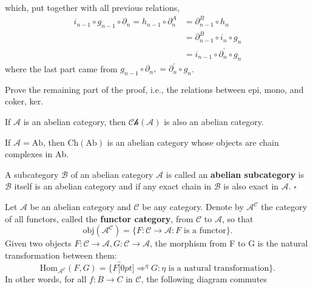 \documentclass[../category_theory.tex]{subfiles}
\begin{document}
\begin{proof*}
\begin{center}
\begin{tikzpicture}
		\end{tikzpicture}
	\end{center}
	which, put together with all previous relations,
	\begin{align*}
		i_{n-1}\circ g_{n-1}\circ \partial_{n} = h_{n-1}\circ \partial_{n}^{A} & =\partial_{n-1}^{B}\circ h_{n}            \\
		                                                                       & =\partial_{n-1}^{B}\circ i_{n}\circ g_{n} \\
		                                                                       & =i_{n-1}\circ \partial_{n}^{'}\circ g_{n}
	\end{align*}
	where the last part came from \(g_{n-1}\circ \partial_{n},=\partial_{n}^{'}\circ g_{n}\).
	\begin{exr}
		Prove the remaining part of the proof, i.e., the relations between epi, mono, and coker, ker. \qedsymbol
	\end{exr}
\end{proof*}
\begin{theorem*}
	If \(\mathcal{A}\) is an abelian category, then \(\mathcal{Ch}(\mathcal{A})\) is also an abelian category.
\end{theorem*}
\begin{example}
	If \(\mathcal{A}=\mathrm{Ab}\), then \(\mathrm{Ch}(\mathrm{Ab})\) is an abelian category whose objects are chain complexes in Ab.
\end{example}
\begin{def*}
	A subcategory \(\mathcal{B}\) of an abelian category \(\mathcal{A}\) is called an \textbf{abelian subcategory} is \(\mathcal{B}\) itself is an abelian category and if any exact chain in \(\mathcal{B}\) is also exact in \(\mathcal{A}.\) \(\square\)
\end{def*}
Let \(\mathcal{A}\) be an abelian category and \(\mathcal{C}\) be any category. Denote by \(\mathcal{A}^{\mathcal{C}}\) the category of all functors, called the \textbf{functor category}, from \(\mathcal{C}\) to \(\mathcal{A}\), so that
\[
	\mathrm{obj}(\mathcal{A}^{\mathcal{C}})=\{F:\mathcal{C}\rightarrow \mathcal{A}: F\text{ is a functor}\}.
\]
Given two objects \(F:\mathcal{C}\rightarrow \mathcal{A}, G:\mathcal{C}\rightarrow \mathcal{A}\), the morphism from F to G is the natural transformation between them:
\[
	\mathrm{Hom}_{\mathcal{A}^{\mathcal{C}}}(F, G)=\{F \overbracket[0pt]{\Rightarrow}^{\eta }G: \eta \text{ is a natural transformation}\}.
\]
In other words, for all \(f:B\rightarrow C\) in \(\mathcal{C}\), the following diagram commutes
\end{document}
